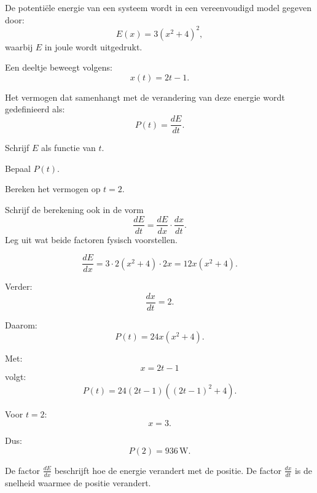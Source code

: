 \documentclass{ximera}
\begin{document}
\begin{oefening}{\oefG}

De potentiële energie van een systeem wordt in een vereenvoudigd model
gegeven door:
\[
E(x)=3(x^2+4)^2,
\]
waarbij $E$ in joule wordt uitgedrukt.

Een deeltje beweegt volgens:
\[
x(t)=2t-1.
\]

Het vermogen dat samenhangt met de verandering van deze energie wordt
gedefinieerd als:
\[
P(t)=\frac{dE}{dt}.
\]

\begin{question}
Schrijf $E$ als functie van $t$.
\end{question}

\begin{question}
Bepaal $P(t)$.
\end{question}

\begin{question}
Bereken het vermogen op $t=2$.
\end{question}

\begin{question}
Schrijf de berekening ook in de vorm
\[
\frac{dE}{dt}
=
\frac{dE}{dx}\cdot\frac{dx}{dt}.
\]
Leg uit wat beide factoren fysisch voorstellen.
\end{question}

\begin{oplossing}

\[
\frac{dE}{dx}
=
3\cdot2(x^2+4)\cdot2x
=
12x(x^2+4).
\]

Verder:
\[
\frac{dx}{dt}=2.
\]

Daarom:
\[
P(t)=24x(x^2+4).
\]

Met:
\[
x=2t-1
\]
volgt:
\[
\boxed{
P(t)
=
24(2t-1)\left((2t-1)^2+4\right)
}.
\]

Voor $t=2$:
\[
x=3.
\]

Dus:
\[
\boxed{P(2)=936\,\mathrm W.}
\]

De factor $\frac{dE}{dx}$ beschrijft hoe de energie verandert met de positie.
De factor $\frac{dx}{dt}$ is de snelheid waarmee de positie verandert.

\end{oplossing}

\end{oefening}
\end{document}
